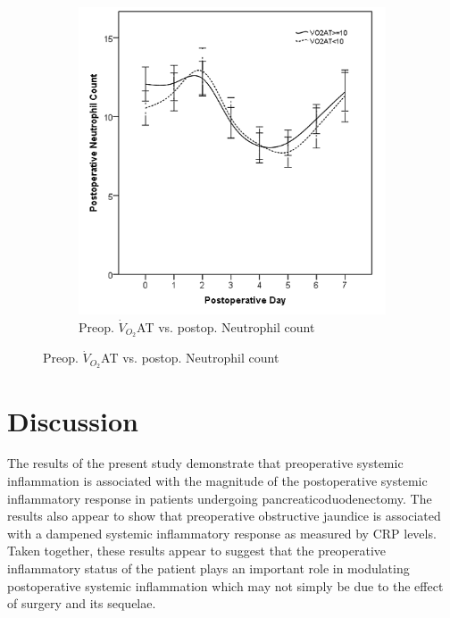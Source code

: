 \begin{figure}[p]
	\vspace{1cm}
		

	\begin{subfigure}{0.48\textwidth}
		\centering
		\includegraphics[width=\textwidth]{Figures/sirs_at_neut}
		\caption{Preop. $\dot{V}_{O_2}$AT vs. postop. Neutrophil count}
		\label{fig:sirs_at_neut}
	\end{subfigure}	
\end{figure}





\clearpage
\section{Discussion}

The results of the present study demonstrate that preoperative systemic inflammation is associated with the magnitude of the postoperative systemic inflammatory response  in patients undergoing pancreaticoduodenectomy. 
The results also appear to show that preoperative obstructive jaundice is associated with a dampened systemic inflammatory response as measured by CRP levels. 
Taken together, these results appear to suggest that the preoperative inflammatory status of the patient plays an important role in modulating postoperative systemic inflammation which may not simply be due to the effect of surgery and its sequelae.

